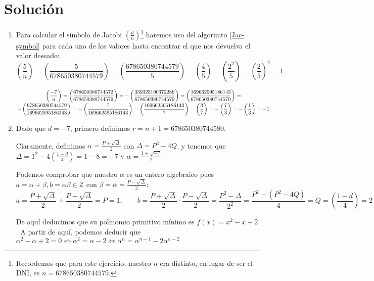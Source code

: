 \section*{Solución}
	\begin{enumerate}
		\item Para calcular el símbolo de Jacobi $\displaystyle \left(\frac{d}{n}\right)$\footnote{Recordemos que
		para este ejercicio, nuestro $n$ era distinto, en lugar de ser el DNI, es $n = 678650380744579$.} haremos
		uso del algorimto \ref{Jac-symbol} para cada uno de los valores hasta encontrar el que nos devuelva el
		valor deseado:
		$$\left(\frac{5}{n}\right) = \left(\frac{5}{678650380744579} \right)= \left(\frac{678650380744579}{5}\right)
		= \left(\frac{4}{5}\right) = \left(\frac{2^2}{5}\right) = \left(\frac{2}{5}\right)^2 = 1$$
		
		$$\displaystyle \left(\frac{-7}{n}\right) = \left(\frac{678650380744572}{678650380744579} \right)=
		-\left(\frac{339325190372286}{678650380744579} \right) = \left(\frac{169662595186143}{678650380744579} \right)
		= \atop \displaystyle -\left(\frac{678650380744579}{169662595186143} \right) = -\left(\frac{7}
		{169662595186143} \right) = \left(\frac{169662595186143}{7} \right) = \left(\frac{3}{7} \right) =
		-\left(\frac{7}{3} \right) = -\left(\frac{1}{3} \right) = -1$$
		
		\item Dado que $d = -7$, primero definimos $r = n+1 = 678650380744580$.
		
		Claramente, definimos $\displaystyle \alpha = \frac{P + \sqrt{\Delta}}{2}$ con $\Delta = P^2 - 4Q$,
		y tenemos que $\displaystyle \Delta = 1^2 - 4\left(\frac{1-d}{4}\right) = 1-8 = -7$ y $\displaystyle
		\alpha = \frac{1 + \sqrt{-7}}{2}$
		
		Podemos comprobar que nuestro $\alpha$ es un entero algebraico pues $a = \alpha + \beta, b = \alpha
		\beta \in \mathbb{Z}$ con $\displaystyle \beta = \overline{\alpha} = \frac{P - \sqrt{\Delta}}{2}$:
		$$\displaystyle a = \frac{P + \sqrt{\Delta}}{2} + \frac{P - \sqrt{\Delta}}{2} = P = 1, \qquad
		b = \frac{P + \sqrt{\Delta}}{2} \cdot \frac{P - \sqrt{\Delta}}{2} = \frac{P^2-\Delta}{2^2} =
		\frac{P^2-(P^2-4Q)}{4} = Q = \left(\frac{1-d}{4}\right) = 2$$
		
		De aquí deducimos que su polinomio primitivo mínimo es $f(x) = x^2 -x +2$. A partir de aquí, podemos
		deducir que $\alpha^2 -\alpha +2 = 0 \Leftrightarrow \alpha^2  = \alpha -2 \Leftrightarrow \alpha^n =
		\alpha^{n-1} - 2\alpha^{n-2}$
		

\end{enumerate}
